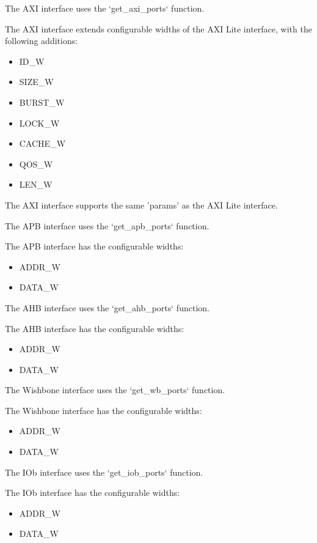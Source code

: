 %
%

The AXI interface uses the `get\_axi\_ports` function.


The AXI interface extends configurable widths of the AXI Lite interface, with the following additions:
\begin{itemize}
  \item ID_W
  \item SIZE_W
  \item BURST_W
  \item LOCK_W
  \item CACHE_W
  \item QOS_W
  \item LEN_W
\end{itemize}

The AXI interface supports the same 'params' as the AXI Lite interface.

%
%

The APB interface uses the `get\_apb\_ports` function.


The APB interface has the configurable widths:
\begin{itemize}
  \item ADDR_W
  \item DATA_W
\end{itemize}

%
%

The AHB interface uses the `get\_ahb\_ports` function.


The AHB interface has the configurable widths:
\begin{itemize}
  \item ADDR_W
  \item DATA_W
\end{itemize}

%
%

The Wishbone interface uses the `get\_wb\_ports` function.


The Wishbone interface has the configurable widths:
\begin{itemize}
  \item ADDR_W
  \item DATA_W
\end{itemize}

%
%

The IOb interface uses the `get\_iob\_ports` function.


The IOb interface has the configurable widths:
\begin{itemize}
  \item ADDR_W
  \item DATA_W
\end{itemize}
